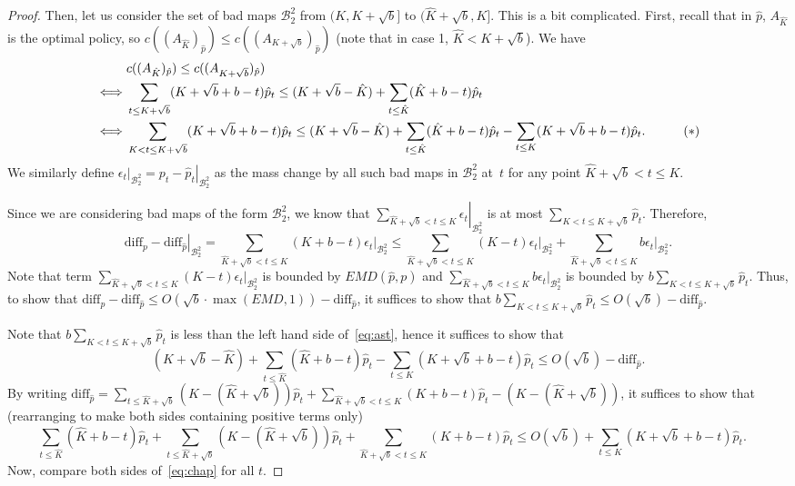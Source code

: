 \begin{proof}
    Then, let us consider the set of bad maps $\mathcal{B}^2_2$ from $(K,K+\sqrt{b}]$ to $(\hat{K}+\sqrt{b},K]$. This is a bit complicated. First, recall that in $\hat{p}$, $A_{\hat{K}}$ is the optimal policy, so $c((A_{\hat{K}})_{\hat{p}}) \leq c((A_{K+\sqrt{b}})_{\hat{p}})$ (note that in case 1, $\hat{K}<K+\sqrt{b}$). We have
    \begin{align}
    & c((A_{\hat{K}})_{\hat{p}}) \leq c((A_{K+\sqrt{b}})_{\hat{p}}) \notag \\
    \iff & \sum_{t \leq  K+\sqrt{b}} (K+\sqrt{b}+b-t)\hat{p}_t \leq (K+\sqrt{b}-\hat{K}) +  \sum_{t \leq \hat{K}}(\hat{K}+b -t )\hat{p}_t \notag \\
    \iff & \sum_{K<t \leq  K+\sqrt{b}} (K+\sqrt{b}+b-t)\hat{p}_t \leq (K+\sqrt{b}-\hat{K}) +  \sum_{t \leq \hat{K}}(\hat{K}+b -t )\hat{p}_t - \sum_{t \leq  K} (K+\sqrt{b}+b-t)\hat{p}_t. \quad \label{eq:ast} \tag{\(\ast\)}
    \end{align}
    We similarly define $\left. \epsilon_t \right|_{\mathcal{B}^2_2} = \left. p_t - \hat{p}_t \right|_{\mathcal{B}^2_2}$ as the mass change by all such bad maps in $\mathcal{B}^2_2$ at~$t$ for any point $\hat{K}+\sqrt{b}<t \leq K$.

    Since we are considering bad maps of the form $\mathcal{B}^2_2$, we know that $\left. \sum_{ \hat{K}+\sqrt{b}<t \leq K} \epsilon_t \right|_{\mathcal{B}^2_2}$ is at most $\sum_{K<t \leq K+\sqrt{b}}\hat{p}_t$. Therefore, 
    $$\left. \text{diff}_p - \text{diff}_{\hat{p}}\right|_{\mathcal{B}^2_2} = \sum_{\hat{K} + \sqrt{b}< t \leq K}(K+b-t)\left.\epsilon_t \right|_{\mathcal{B}^2_2} \leq \sum_{\hat{K} + \sqrt{b}< t \leq K}(K-t)\left.\epsilon_t \right|_{\mathcal{B}^2_2} + \sum_{\hat{K} + \sqrt{b}< t \leq K}b\left.\epsilon_t \right|_{\mathcal{B}^2_2}.$$
    Note that term $\sum_{\hat{K} + \sqrt{b}< t \leq K}(K-t)\left.\epsilon_t \right|_{\mathcal{B}^2_2}$ is bounded by $EMD(\hat{p},p)$ and $\sum_{\hat{K} + \sqrt{b}< t \leq K}b\left.\epsilon_t \right|_{\mathcal{B}^2_2}$ is bounded by $b\sum_{K<t \leq K+\sqrt{b}}\hat{p}_t$. Thus, to show that $\text{diff}_p - \text{diff}_{\hat{p}} \leq O(\sqrt{b} \cdot \max(EMD,1)) - \text{diff}_{\hat{p}}$, it suffices to show that $b\sum_{K<t \leq K+\sqrt{b}}\hat{p}_t \leq O(\sqrt{b}) - \text{diff}_{\hat{p}}$.

    Note that $b\sum_{K<t \leq K+\sqrt{b}}\hat{p}_t$ is less than the left hand side of~\eqref{eq:ast}, hence it suffices to show that
    \[(K+\sqrt{b}-\hat{K}) +  \sum_{t \leq \hat{K}}(\hat{K}+b -t )\hat{p}_t - \sum_{t \leq  K} (K+\sqrt{b}+b-t)\hat{p}_t \leq O(\sqrt{b}) - \text{diff}_{\hat{p}}.\]
    By writing $\text{diff}_{\hat{p}}=\sum_{t \leq \hat{K}+\sqrt{b}}(K-(\hat{K}+\sqrt{b}))\hat{p}_t + \sum_{\hat{K}+\sqrt{b}< t \leq K}(K+b-t)\hat{p}_t - (K-(\hat{K}+\sqrt{b}))$, it suffices to show that (rearranging to make both sides containing positive terms only)
    \[\sum_{t \leq \hat{K}}(\hat{K}+b -t )\hat{p}_t + \sum_{t \leq \hat{K}+\sqrt{b}}(K-(\hat{K}+\sqrt{b}))\hat{p}_t + \sum_{\hat{K}+\sqrt{b}< t \leq K}(K+b-t)\hat{p}_t \leq O(\sqrt{b}) + \sum_{t \leq  K} (K+\sqrt{b}+b-t)\hat{p}_t. \quad \label{eq:chap} \tag{\(\S\)} \]
    Now, compare both sides of~\eqref{eq:chap} for all $t$.


\end{proof}
